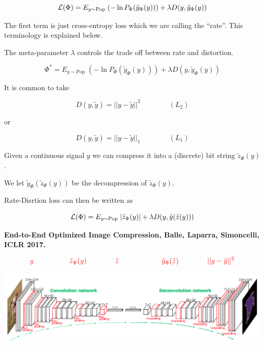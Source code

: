 {

$${\cal L}(\Phi) = E_{y \sim \mathrm{Pop}}\;(- \ln P_\Phi(\tilde{y}_\Phi(y))) + \lambda D(y,\tilde{y}_\Phi(y))$$

\vfill
The first term is just cross-entropy loss which we are calling the ``rate''.  This terminology is explained below.

\vfill
The meta-parameter $\lambda$ controls the trade off between rate and distortion.



$$\Phi^* = E_{y \sim \mathrm{Pop}}\;(- \ln P_\Phi(\tilde{y}_\Phi(y))) + \lambda D(y,\tilde{y}_\Phi(y))$$

\vfill
It is common to take

$$D(y,\tilde{y}) = ||y-\tilde{y}||^2 \hspace{4em}(L_2)$$

\vfill
or

$$D(y,\tilde{y}) = ||y-\tilde{y}||_1 \hspace{4em} (L_1)$$


Given a continuous signal $y$ we can compress it into a (discrete) bit string $\tilde{z}_\Phi(y)$.

\vfill
We let $\tilde{y}_\Phi(\tilde{z}_\Phi(y))$ be the decompression of $\tilde{z}_\Phi(y)$.

\vfill
Rate-Disrtion loss can then be written as

$${\cal L}(\Phi) = E_{y \sim \mathrm{Pop}}\;|\tilde{z}_\Phi(y)| + \lambda D(y,\tilde{y}(\tilde{z}(y)))$$


{\bf End-to-End Optimized Image Compression, Balle, Laparra, Simoncelli, ICLR 2017.}


\vfill
$${\color{red}y \hspace{5em}  \tilde{z}_\Psi(y) \hspace{4em} \tilde{z} \hspace{6em} \tilde{y}_\Phi(\tilde{z}) \hspace{4em}||y - \tilde{y}||^2}$$
\centerline{\includegraphics[width=9in]{../images/Deconv}}

}
